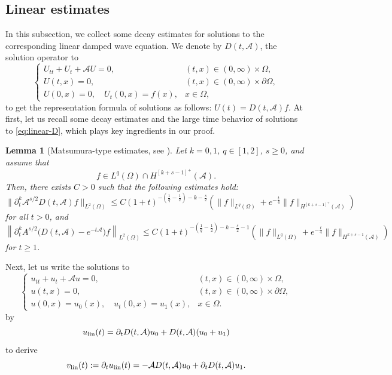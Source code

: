 \documentclass[a4paper,11pt]{article} %
\newtheorem{lemma}[theorem]{Lemma}
\theoremstyle{remark}
\theoremstyle{definition}
\numberwithin{equation}{section}
\begin{document}
\subsection{Linear estimates}
In this subsection, we collect some decay estimates for solutions to the corresponding linear damped wave equation. We denote by \(D(t,\mathcal{A})\), the solution operator to
\begin{equation}\label{eq:linear-D}
\begin{cases}
U_{tt}+U_t+ \mathcal{A}U=0, &(t,x)\in(0,\infty)\times\Omega,\\
U(t,x)=0, &(t,x)\in(0,\infty)\times \partial\Omega, \\
U(0,x)=0,\quad U_t(0,x)=f(x), & x\in \Omega,
\end{cases}
\end{equation}
to get the representation formula of solutions as follows: $U(t)=D(t,\mathcal{A})f$. At first, let us recall some decay estimates and the large time behavior of solutions to \eqref{eq:linear-D}, which plays key ingredients in our proof.

\begin{lemma}[Matsumura-type estimates, see \cite{IkedaSobajimaTaniguchiWakasugi2024}]\label{lem:Mats}
Let \(k=0,1\), \(q\in[1,2]\), \(s\ge0\), and assume that
\[
f\in L^q(\Omega)\cap H^{[k+s-1]^+}(\mathcal{A}).
\]
Then, there exists \(C>0\) such that the following estimates hold:
\begin{equation}\label{eq:Mats}
\big\|\partial_t^k \mathcal{A}^{s/2}D(t,\mathcal{A})f\big\|_{L^2(\Omega)}
\le
C(1+t)^{-\left(\frac1q-\frac12\right)-k-\frac{s}{2}}
\left(
\|f\|_{L^q(\Omega)}
+
e^{-\frac{t}{4}}\|f\|_{H^{[k+s-1]^+}(\mathcal{A})}
\right)
\end{equation}
for all \(t>0\), and
\begin{equation}
\label{eq:linear-diffusion-estimate-used}
\left\|
\partial_t^k A^{s/2}
\Big(D(t,\mathcal{A})-e^{-t\mathcal{A}}\Big)f
\right\|_{L^2(\Omega)}
\le
C(1+t)^{-\left(\frac1q-\frac12\right)-k-\frac{s}{2}-1}
\left(
\|f\|_{L^q(\Omega)}
+
e^{-\frac{t}{4}}\|f\|_{H^{k+s-1}(\mathcal{A})}
\right)
\end{equation}
for \(t\ge1\).
\end{lemma}
Next, let us write the solutions to
$$
\begin{cases}
u_{tt}+u_t+ \mathcal{A}u= 0, &(t,x)\in(0,\infty)\times\Omega,\\
u(t,x)=0, &(t,x)\in(0,\infty)\times \partial\Omega, \\
u(0,x)=u_0(x),\quad u_t(0,x)=u_1(x), & x\in \Omega.
\end{cases}
$$
by
\[
u_{\rm lin}(t)
=
\partial_tD(t,\mathcal{A})u_0+D(t,\mathcal{A})(u_0+u_1)
\]
to derive
\[
v_{\rm lin}(t):=\partial_tu_{\rm lin}(t)
=
-\mathcal{A}D(t,\mathcal{A})u_0+\partial_tD(t,\mathcal{A})u_1.
\]
\end{document}
